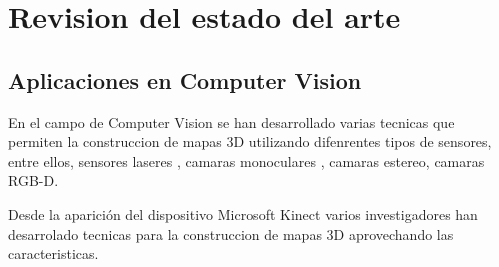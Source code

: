 \chapter{Revision del estado del arte}
\section{Aplicaciones en Computer Vision}

En el campo de Computer Vision se han desarrollado varias tecnicas que permiten la construccion de mapas 3D utilizando difenrentes tipos de sensores, entre ellos, sensores laseres \cite{chou2013robotic}, camaras monoculares \cite{tomono2009robust}, camaras estereo, camaras RGB-D.

Desde la aparición del dispositivo Microsoft Kinect varios investigadores han desarrolado tecnicas para la construccion de mapas 3D aprovechando las caracteristicas.
